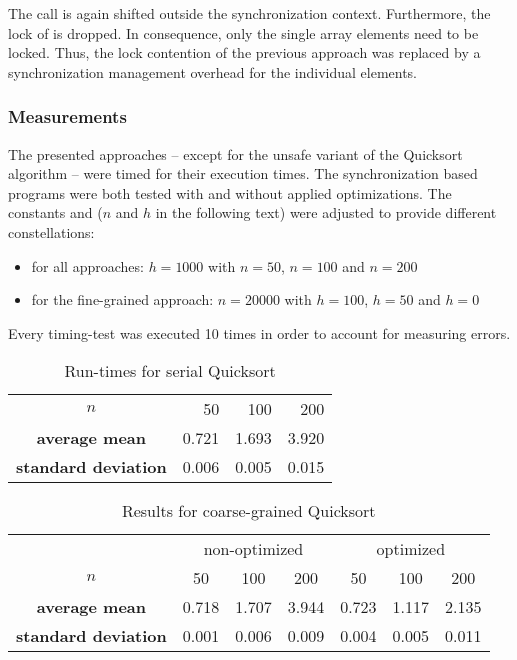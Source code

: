 The call  is again shifted outside the synchronization context. Furthermore, the lock of  is dropped. In consequence, only the single array elements need to be locked. Thus, the lock contention of the previous approach was replaced by a synchronization management overhead for the individual elements.

\subsubsection{Measurements}
The presented approaches -- except for the unsafe variant of the Quicksort algorithm -- were timed for their execution times. The synchronization based programs were both tested with and without applied optimizations. The constants  and  ($n$ and $h$ in the following text) were adjusted to provide different constellations:
\begin{itemize}
\item for all approaches: $h = 1000$ with $n = 50$, $n = 100$ and $n = 200$
\item for the fine-grained approach: $n = 20000$ with $h = 100$, $h = 50$ and $h = 0$
\end{itemize}
Every timing-test was executed 10 times in order to account for measuring errors.

\begin{table}[h!]
\begin{center}
\begin{tabular}{ c| r|r|r|}
\cline{2-4} $n$ & 50 & 100 & 200 \\ 
\cline{2-4} \textbf{average mean} & 0.721 & 1.693 & 3.920 \\ 
\cline{2-4} \textbf{standard deviation} & 0.006 & 0.005 & 0.015 \\ 
\cline{2-4}
\end{tabular} 
\caption{Run-times for serial Quicksort}
\label{table:serial_quicksort}
\end{center}
\end{table}


\begin{table}[h!]
\begin{center}
\begin{tabular}{c |c|c|c||c|c|c|}
  \multicolumn{1}{c}{} & \multicolumn{3}{c}{non-optimized} & \multicolumn{3}{c}{optimized}\\ \cline{2-7}
  $n$ & 50 & 100 & 200 & 50 & 100 & 200\\ \cline{2-7}
  \textbf{average mean} & 0.718 & 1.707 & 3.944 & 0.723 & 1.117 & 2.135	\\ \cline{2-7}
  \textbf{standard deviation} & 0.001 & 0.006 & 0.009 & 0.004 & 0.005 & 0.011\\ \cline{2-7}
\end{tabular}
\caption{Results for coarse-grained Quicksort}
\label{table:coarse_quicksort}
\end{center}
\end{table}

